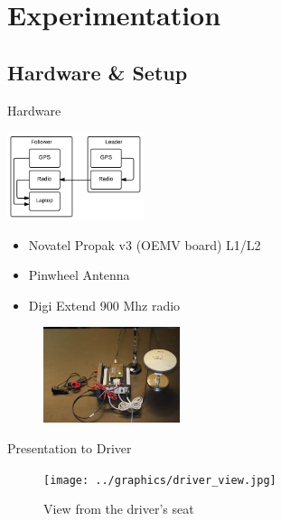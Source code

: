 \documentclass{beamer}
\begin{document}
\section{Experimentation}

  \subsection{Hardware \& Setup}

    \begin{frame}{Hardware}

        \begin{minipage}{0.45\textwidth}
          \centering
          \includegraphics[width=4cm]{../graphics/hardware_flow.png}
        \end{minipage}
        \begin{minipage}{0.45\textwidth}
          \begin{itemize}
            \item Novatel Propak v3 (OEMV board) L1/L2
            \item Pinwheel Antenna
            \item Digi Extend 900 Mhz radio
          \end{itemize}
        \end{minipage}

        \begin{figure}
          \includegraphics[width=4cm]{../graphics/lead_hardware.jpg}
        \end{figure}

    \end{frame}


    \begin{frame}{Presentation to Driver}

      \begin{figure}[ht] \centering
        \texttt{[image: ../graphics/driver\_view.jpg]}
        \caption{View from the driver's seat} \label{fig:driver_view}
      \end{figure}

    \end{frame}
\end{document}
